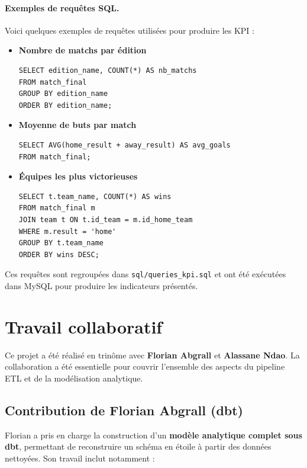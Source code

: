 \documentclass[12pt,a4paper]{article}
\begin{document}
\paragraph{Exemples de requêtes SQL.}

Voici quelques exemples de requêtes utilisées pour produire les KPI :

\begin{itemize}
    \item \textbf{Nombre de matchs par édition}
\begin{verbatim}
SELECT edition_name, COUNT(*) AS nb_matchs
FROM match_final
GROUP BY edition_name
ORDER BY edition_name;
\end{verbatim}

    \item \textbf{Moyenne de buts par match}
\begin{verbatim}
SELECT AVG(home_result + away_result) AS avg_goals
FROM match_final;
\end{verbatim}

    \item \textbf{Équipes les plus victorieuses}
\begin{verbatim}
SELECT t.team_name, COUNT(*) AS wins
FROM match_final m
JOIN team t ON t.id_team = m.id_home_team
WHERE m.result = 'home'
GROUP BY t.team_name
ORDER BY wins DESC;
\end{verbatim}

\end{itemize}

Ces requêtes sont regroupées dans \texttt{sql/queries\_kpi.sql} et ont été exécutées dans MySQL pour produire les indicateurs présentés.

\newpage
\section{Travail collaboratif}

Ce projet a été réalisé en trinôme avec \textbf{Florian Abgrall} et \textbf{Alassane Ndao}.  
La collaboration a été essentielle pour couvrir l’ensemble des aspects du pipeline ETL et de la modélisation analytique.

\subsection*{Contribution de Florian Abgrall (dbt)}

Florian a pris en charge la construction d’un \textbf{modèle analytique complet sous dbt}, permettant de reconstruire un schéma en étoile à partir des données nettoyées.  
Son travail inclut notamment :
\end{document}

